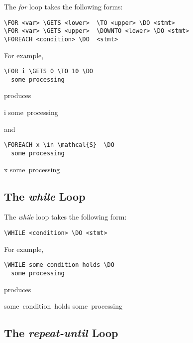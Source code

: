 \documentclass{article}
\begin{document}
The {\em for} loop takes the following forms:
\begin{verbatim}
\FOR <var> \GETS <lower>  \TO <upper> \DO <stmt> 
\FOR <var> \GETS <upper>  \DOWNTO <lower> \DO <stmt> 
\FOREACH <condition> \DO  <stmt> 
\end{verbatim}
For example,
\begin{verbatim}
\FOR i \GETS 0 \TO 10 \DO
  some processing
\end{verbatim}
produces

\medskip
\begin{pseudocode}[display]{}{}
\FOR i   \DO
\mbox{some processing}
\end{pseudocode}

\noindent{}and

\begin{verbatim}
\FOREACH x \in \mathcal{S}  \DO
  some processing 
\end{verbatim}


\medskip
\begin{pseudocode}[display]{}{}
\FOREACH x \in {}  \DO
  \mbox{some processing}
\end{pseudocode}

\subsection{The {\em while} Loop}

The {\em while} loop takes the following form:

\begin{verbatim}
\WHILE <condition> \DO <stmt> 
\end{verbatim}

\noindent{}For example,

\begin{verbatim}
\WHILE some condition holds \DO 
  some processing 
\end{verbatim}

\noindent{}produces

\medskip
\begin{pseudocode}[display]{}{}
\WHILE \mbox{some condition holds} \DO 
\mbox{some processing }
\end{pseudocode}

\subsection{The {\em repeat-until} Loop}
\end{document}
